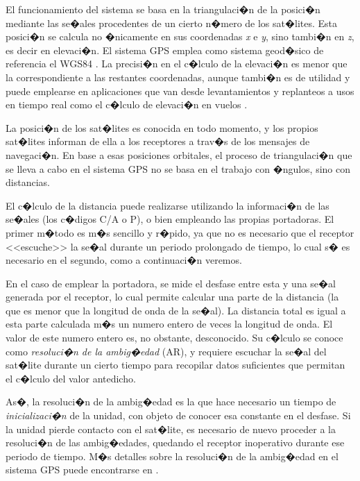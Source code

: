 El funcionamiento del sistema se basa en la triangulaci�n de la posici�n mediante las se�ales procedentes de un cierto n�mero de los sat�lites. Esta posici�n se calcula no �nicamente en sus coordenadas \emph{x} e \emph{y}, sino tambi�n en \emph{z}, es decir en elevaci�n. El sistema GPS emplea como sistema geod�sico de referencia el WGS84 \cite{WGS84}. La precisi�n en el c�lculo de la elevaci�n es menor que la correspondiente a las restantes coordenadas, aunque tambi�n es de utilidad y puede emplearse en aplicaciones que van desde levantamientos y replanteos a usos en tiempo real como el c�lculo de elevaci�n en vuelos \cite{Graas1991Navigation}.

La posici�n de los sat�lites es conocida en todo momento, y los propios sat�lites informan de ella a los receptores a trav�s de los mensajes de navegaci�n. En base a esas posiciones orbitales, el proceso de triangulaci�n que se lleva a cabo en el sistema GPS no se basa en el trabajo con �ngulos, sino con distancias.

El c�lculo de la distancia puede realizarse utilizando la informaci�n de las se�ales (los c�digos C/A o P), o bien empleando las propias portadoras. El primer m�todo es m�s sencillo y r�pido, ya que no es necesario que el receptor <<escuche>> la se�al durante un periodo prolongado de tiempo, lo cual s� es necesario en el segundo, como a continuaci�n veremos. 

En el caso de emplear la portadora, se mide el desfase entre esta y una se�al generada por el receptor, lo cual permite calcular una parte de la distancia (la que es menor que la longitud de onda de la se�al). La distancia total es igual a esta parte calculada m�s un numero entero de veces la longitud de onda. El valor de este numero entero es, no obstante, desconocido. Su c�lculo se conoce como \emph{resoluci�n de la ambig�edad} (AR), y requiere escuchar la se�al del sat�lite durante un cierto tiempo para recopilar datos suficientes que permitan el c�lculo del valor antedicho.

As�, la resoluci�n de la ambig�edad es la que hace necesario un tiempo de \emph{inicializaci�n} de la unidad, con objeto de conocer esa constante en el desfase. Si la unidad pierde contacto con el sat�lite, es necesario de nuevo proceder a la resoluci�n de las ambig�edades, quedando el receptor inoperativo durante ese periodo de tiempo. M�s detalles sobre la resoluci�n de la ambig�edad en el sistema GPS puede encontrarse en \cite{Torrecillas1998Mapping}.

